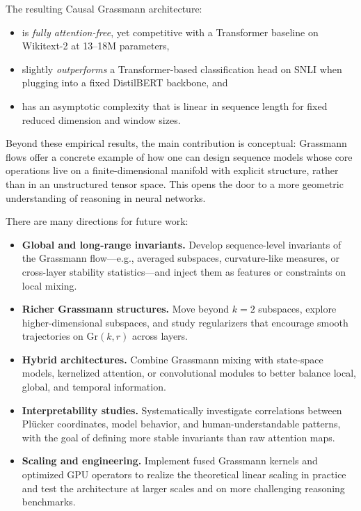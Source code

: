 \documentclass[11pt]{article}
\newcommand{\Gr}{\mathrm{Gr}}
\begin{document}
The resulting Causal Grassmann architecture:

\begin{itemize}
    \item is \emph{fully attention-free}, yet competitive with a Transformer baseline on Wikitext-2 at 13--18M parameters,
    \item slightly \emph{outperforms} a Transformer-based classification head on SNLI when plugging into a fixed DistilBERT backbone, and
    \item has an asymptotic complexity that is linear in sequence length for fixed reduced dimension and window sizes.
\end{itemize}

Beyond these empirical results, the main contribution is conceptual: Grassmann flows offer a concrete example of how one can design sequence models whose core operations live on a finite-dimensional manifold with explicit structure, rather than in an unstructured tensor space. This opens the door to a more geometric understanding of reasoning in neural networks.

There are many directions for future work:

\begin{itemize}
    \item \textbf{Global and long-range invariants.} Develop sequence-level invariants of the Grassmann flow---e.g., averaged subspaces, curvature-like measures, or cross-layer stability statistics---and inject them as features or constraints on local mixing.
    \item \textbf{Richer Grassmann structures.} Move beyond $k=2$ subspaces, explore higher-dimensional subspaces, and study regularizers that encourage smooth trajectories on $\Gr(k,r)$ across layers.
    \item \textbf{Hybrid architectures.} Combine Grassmann mixing with state-space models, kernelized attention, or convolutional modules to better balance local, global, and temporal information.
    \item \textbf{Interpretability studies.} Systematically investigate correlations between Pl\"ucker coordinates, model behavior, and human-understandable patterns, with the goal of defining more stable invariants than raw attention maps.
    \item \textbf{Scaling and engineering.} Implement fused Grassmann kernels and optimized GPU operators to realize the theoretical linear scaling in practice and test the architecture at larger scales and on more challenging reasoning benchmarks.
\end{itemize}
\end{document}
